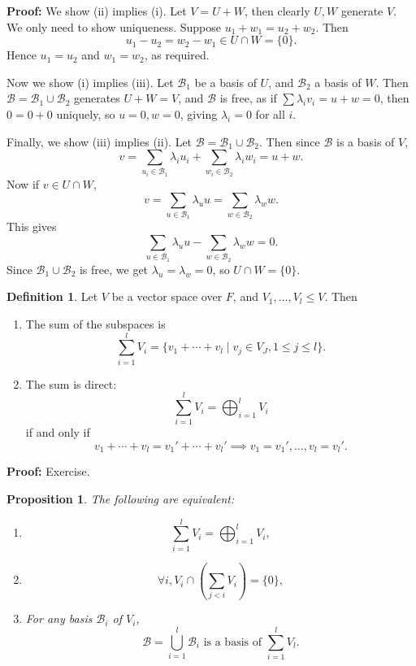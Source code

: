 \documentclass[12pt]{article}
\newtheorem{proposition}{Proposition}[section]
\theoremstyle{definition}
\newtheorem{definition}{Definition}[section]
\theoremstyle{remark}
\begin{document}
\begin{adjustbox}{minipage = \columnwidth - 25.5pt, margin=1em, frame=1pt, margin=0em}
	\textbf{Proof:} We show (ii) implies (i). Let $V = U + W$, then clearly $U, W$ generate $V$. We only need to show uniqueness. Suppose $u_1 + w_1 = u_2 + w_2$. Then
	\[
		u_1 - u_2 = w_2 - w_1 \in U \cap W = \{0\}
	.\]
	Hence $u_1 = u_2$ and $w_1 = w_2$, as required.

	Now we show (i) implies (iii). Let $\mathcal{B}_1$ be a basis of $U$, and $\mathcal{B}_2$ a basis of $W$. Then $\mathcal{B} = \mathcal{B}_1 \cup \mathcal{B}_2$ generates $U + W = V$, and $\mathcal{B}$ is free, as if $\sum \lambda_i v_i = u + w = 0$, then $0 = 0 + 0$ uniquely, so $u = 0, w = 0$, giving $\lambda_i = 0$ for all $i$.

	Finally, we show (iii) implies (ii). Let $\mathcal{B} = \mathcal{B}_1 \cup \mathcal{B}_2$. Then since $\mathcal{B}$ is a basis of $V$,
	\[
	v = \sum_{u_i \in \mathcal{B}_1}\lambda_i u_i + \sum_{w_i \in \mathcal{B}_2}\lambda_i w_i = u + w
	.\]
	Now if $v \in U \cap W$,
	\[
	v = \sum_{u \in \mathcal{B}_1} \lambda_u u = \sum_{w \in \mathcal{B}_2} \lambda_w w
	.\]
	This gives
	\[
	\sum_{u \in \mathcal{B}_1}\lambda_u u - \sum_{w \in \mathcal{B}_2} \lambda_w w = 0
	.\]
	Since $\mathcal{B}_1 \cup \mathcal{B}_2$ is free, we get $\lambda_u = \lambda_w = 0$, so $U \cap W = \{0\}$.
\end{adjustbox}

\begin{definition}
	Let $V$ be a vector space over $F$, and $V_1, \ldots, V_l \leq V$. Then
	\begin{enumerate}[\normalfont(i)]
		\item The sum of the subspaces is
			\[
				\sum_{i = 1}^{l} V_i = \{v_1 + \cdots + v_l \mid v_j \in V_J, 1 \leq j \leq l \}
			.\]
		\item The sum is direct:
			\[
			\sum_{i = 1}^{l} V_i = \bigoplus_{i = 1}^{l} V_i
			\]
			if and only if
			\[
			v_1 + \cdots + v_l = v_1' + \cdots + v_l' \implies v_1 = v_1', \ldots, v_l = v_l'
			.\]
	\end{enumerate}
	
\end{definition}

\begin{adjustbox}{minipage = \columnwidth - 25.5pt, margin=1em, frame=1pt, margin=0em}
\textbf{Proof:} Exercise.
\end{adjustbox}

\begin{proposition}
	The following are equivalent:
	\begin{enumerate}[\normalfont(i)]
		\item
			\[
			\sum_{i = 1}^{l} V_i = \bigoplus_{i = 1}^{l} V_i
			,\]
		\item 
			\[
				\forall i, V_i \cap \left( \sum_{j < i} V_i \right) = \{0\}
			,\]
		\item For any basis $\mathcal{B}_i$ of $V_i$,
			\[
				\mathcal{B} = \bigcup_{i = 1}^{l} \mathcal{B}_i \text{ is a basis of } \sum_{i = 1}^{l} V_l
			.\]
	\end{enumerate}
	
\end{proposition}
\end{document}
